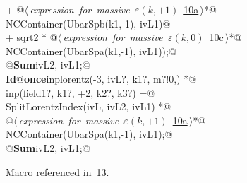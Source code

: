 \documentclass[a4paper,12pt]{amsart}
\renewcommand{\NWlink}[2]{\hyperlink{#1}{#2}}
\renewcommand{\NWtxtMacroRefIn}{Macro referenced in}
\renewcommand{\NWsep}{${\diamond}$}
\begin{document}
\begin{flushleft}
\begin{minipage}{\linewidth}
\begin{list}{}{}
\mbox{}\verb@   + @\hbox{$\langle\,${\itshape expression for massive $\varepsilon(k, +1)$}\nobreak\ {\footnotesize \NWlink{nuweb10a}{10a}}$\,\rangle$}\verb@ *@\\
\mbox{}\verb@     NCContainer(UbarSpb(k1,-1), ivL1)@\\
\mbox{}\verb@   + sqrt2 * @\hbox{$\langle\,${\itshape expression for massive $\varepsilon(k, 0)$}\nobreak\ {\footnotesize \NWlink{nuweb10c}{10c}}$\,\rangle$}\verb@ *@\\
\mbox{}\verb@     NCContainer(UbarSpa(k1,-1), ivL1));@\\
\mbox{}\verb@   @\hbox{\sffamily\bfseries Sum}\verb@ ivL2, ivL1;@\\
\mbox{}\verb@@\hbox{\sffamily\bfseries Id}\verb@ @\hbox{\sffamily\bfseries once}\verb@ inplorentz(-3, ivL?, k1?, m?!{0,}) *@\\
\mbox{}\verb@      inp(field1?, k1?, +2, k2?, k3?) =@\\
\mbox{}\verb@   SplitLorentzIndex(ivL, ivL2, ivL1) *@\\
\mbox{}\verb@   @\hbox{$\langle\,${\itshape expression for massive $\varepsilon(k, +1)$}\nobreak\ {\footnotesize \NWlink{nuweb10a}{10a}}$\,\rangle$}\verb@ *@\\
\mbox{}\verb@   NCContainer(UbarSpa(k1,-1), ivL1);@\\
\mbox{}\verb@   @\hbox{\sffamily\bfseries Sum}\verb@ ivL2, ivL1;@\\
\mbox{}\verb@@{\NWsep}
\end{list}
\vspace{-1.5ex}
\footnotesize
\begin{list}{}{\setlength{\itemsep}{-\parsep}\setlength{\itemindent}{-\leftmargin}}
\item \NWtxtMacroRefIn\ \NWlink{nuweb13}{13}.

\item{}
\end{list}
\end{minipage}\vspace{4ex}
\end{flushleft}
\end{document}
